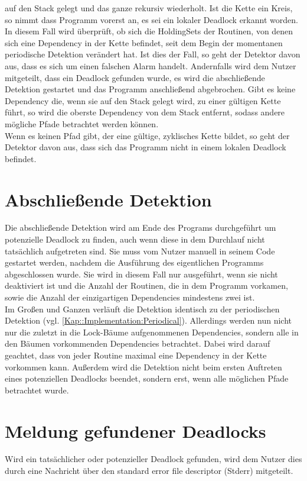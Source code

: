auf den Stack gelegt und das ganze rekursiv wiederholt. Ist die Kette ein Kreis,
so nimmt dass Programm vorerst an, es sei ein lokaler Deadlock erkannt worden.
In diesem Fall wird überprüft, ob sich die HoldingSets der Routinen, von denen
sich eine Dependency in der Kette befindet, seit dem Begin der momentanen 
periodische Detektion verändert hat. Ist dies der Fall, so geht der Detektor
 davon aus, dass es sich um einen falschen Alarm handelt. Andernfalls 
wird dem Nutzer mitgeteilt, dass ein Deadlock gefunden wurde, es wird die 
abschließende Detektion gestartet und das Programm anschließend abgebrochen.
Gibt es keine Dependency die, wenn sie auf den Stack gelegt wird, zu einer 
gültigen Kette führt, so wird die oberste Dependency von dem Stack entfernt,
sodass andere mögliche Pfade betrachtet werden können.\\
Wenn es keinen Pfad gibt, der eine gültige, zyklisches Kette bildet, so geht 
der Detektor davon aus, dass sich das Programm nicht in einem lokalen Deadlock
befindet.

\section{Abschließende Detektion}
Die abschließende Detektion wird am Ende des Programs durchgeführt um 
potenzielle Deadlock zu finden, auch wenn diese in dem Durchlauf nicht 
tatsächlich aufgetreten sind. Sie muss vom Nutzer manuell in seinem Code 
gestartet werden, nachdem die Ausführung des eigentlichen Programms abgeschlossen 
wurde. Sie wird in diesem Fall nur ausgeführt, wenn sie nicht 
deaktiviert ist und
 die Anzahl der Routinen, die in dem Programm vorkamen,
sowie die Anzahl der einzigartigen Dependencies mindestens zwei ist.\\
Im Großen und Ganzen verläuft die Detektion 
identisch zu der periodischen Detektion (vgl. \ref{Kap::Implementation:Periodical}).
Allerdings werden nun nicht nur die zuletzt in die Lock-Bäume aufgenommenen 
Dependencies, sondern alle in den Bäumen vorkommenden Dependencies betrachtet. 
Dabei wird darauf geachtet, dass von jeder Routine maximal eine 
Dependency in der Kette vorkommen kann. Außerdem wird die Detektion nicht beim 
ersten Auftreten eines potenziellen Deadlocks beendet, sondern erst, wenn alle 
möglichen Pfade betrachtet wurde.


\section{Meldung gefundener Deadlocks}\label{Kap::Implementation:Report}
Wird ein tatsächlicher oder potenzieller Deadlock gefunden, wird dem Nutzer 
dies durch eine Nachricht über den standard error file descriptor (Stderr)
mitgeteilt.
